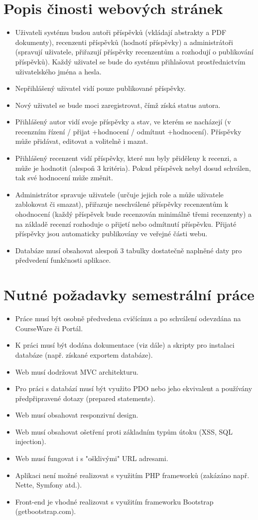 \documentclass[12pt]{report}
\begin{document}
\section{Popis činosti webových stránek}
\begin{itemize}
\item Uživateli systému budou autoři příspěvků (vkládají abstrakty a PDF dokumenty), recenzenti příspěvků (hodnotí příspěvky) a administrátoři (spravují uživatele, přiřazují příspěvky recenzentům a rozhodují o publikování příspěvků). Každý uživatel se bude do systému přihlašovat prostřednictvím uživatelského jména a hesla. 
\item Nepřihlášený uživatel vidí pouze publikované příspěvky.
\item Nový uživatel se bude moci zaregistrovat, čímž získá status autora.
\item Přihlášený autor vidí svoje příspěvky a stav, ve kterém se nacházejí (v recenzním řízení / přijat +hodnocení / odmítnut +hodnocení). Příspěvky může přidávat, editovat a volitelně i mazat.
\item Přihlášený recenzent vidí příspěvky, které mu byly přiděleny k recenzi, a může je hodnotit (alespoň 3 kritéria). Pokud příspěvek nebyl dosud schválen, tak své hodnocení může změnit.
\item Administrátor spravuje uživatele (určuje jejich role a může uživatele zablokovat či smazat), přiřazuje neschválené příspěvky recenzentům k ohodnocení (každý příspěvek bude recenzován minimálně třemi recenzenty) a na základě recenzí rozhoduje o přijetí nebo odmítnutí příspěvku. Přijaté příspěvky jsou automaticky publikovány ve veřejné části webu.
\item Databáze musí obsahovat alespoň 3 tabulky dostatečně naplněné daty pro předvedení funkčnosti aplikace.
\end{itemize}
\section{Nutné požadavky semestrální práce}
\begin{itemize}
\item  Práce musí být osobně předvedena cvičícímu a po schválení odevzdána na CourseWare či Portál.
\item  K práci musí být dodána dokumentace (viz dále) a skripty pro instalaci databáze (např. získané exportem databáze).
\item   Web musí dodržovat MVC architekturu.
\item    Pro práci s databází musí být využito PDO nebo jeho ekvivalent a používány předpřipravené dotazy (prepared statements).
\item    Web musí obsahovat responzivní design.
\item    Web musí obsahovat ošetření proti základním typům útoku (XSS, SQL injection).
\item    Web musí fungovat i s "ošklivými" URL adresami.
\item    Aplikaci není možné realizovat s využitím PHP frameworků (zakázáno např. Nette, Symfony atd.).
\item    Front-end je vhodné realizovat s využitím frameworku Bootstrap (getbootstrap.com).
\end{itemize}
\end{document}
